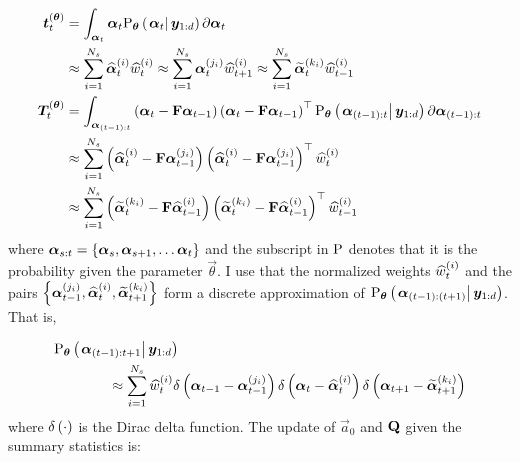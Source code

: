 \begin{equation}\begin{split}
\vec{t}_t^{(\vec{\theta})} &= \int_{\vec{\alpha}_t} \vec{\alpha}_t 
	\optorC{\Prob_{\vec{\theta}}}{\vec{\alpha}_t}{\vec{y}_{1:d}} \partial \vec{\alpha}_t \\
%
& \approx \sum_{i = 1}^{N_s} \particS{\vec{\alpha}}{t}{i} \particS{w}{t}{i} 
\approx \sum_{i = 1}^{N_s} \partic{\vec{\alpha}}{t}{j_i} \particS{w}{t + 1}{i} 
\approx \sum_{i = 1}^{N_s} \particB{\vec{\alpha}}{t}{k_i} \particS{w}{t-1}{i} \\
%
\vec{T}_t^{(\vec{\theta})} &= \int_{\vec{\alpha}_{(t-1):t}} 
	\Lparen{\vec{\alpha}_t - \mat{F}\vec{\alpha}_{t-1}}
	\Lparen{\vec{\alpha}_t - \mat{F}\vec{\alpha}_{t-1}}^\top 
	\optorC{\Prob_{\vec{\theta}}}{\vec{\alpha}_{(t-1):t}}{\vec{y}_{1:d}} 
	\partial \vec{\alpha}_{(t-1):t} \\
%
&\approx \sum_{i = 1}^{N_s}
	\Lparen{\particS{\vec{\alpha}}{t}{i} - \mat{F}\partic{\vec{\alpha}}{t-1}{j_i}}
	\Lparen{\particS{\vec{\alpha}}{t}{i} - \mat{F}\partic{\vec{\alpha}}{t-1}{j_i}}^\top
	\particS{w}{t}{i} \\
%
&\approx \sum_{i = 1}^{N_s}
	\Lparen{\particB{\vec{\alpha}}{t}{k_i} - \mat{F}\particS{\vec{\alpha}}{t-1}{i}}
	\Lparen{\particB{\vec{\alpha}}{t}{k_i} - \mat{F}\particS{\vec{\alpha}}{t-1}{i}}^\top
	\particS{w}{t-1}{i}
\end{split}\end{equation}%
%
% 
where $\vec{\alpha}_{s:t} = \Lbrace{\vec{\alpha}_s, \vec{\alpha}_{s +1}, \dots \vec{\alpha}_t}$ and the subscript in $\text{P}$ denotes that it is the probability given the parameter $\vec{\theta}$. I use that the normalized weights $\widehat{w}_{t}^{\left( i\right)}$ and the pairs $\left\{ \bm{\alpha}_{t-1}^{\left( j_i\right)}, \widehat{\bm{\alpha}}_{t}^{\left( i\right)}, \widetilde{\bm{\alpha}}_{t + 1}^{\left( k_i\right)}\right\}$ form a discrete approximation of $\optorC{\Prob_{\vec{\theta}}}{\vec{\alpha}_{(t-1):(t+1)}}{{\vec{y}_{1:d}}}$. That is, 

\begin{equation}\begin{split}
\optorC{\Prob_{\vec{\theta}}}{\vec{\alpha}_{(t-1):{t+1}}}{\vec{y}_{1:d}} \hspace{-50pt} & \\
%
	& \approx \sum_{i=1}^{N_s}\particS{w}{t}{i} 
		\dirac{\vec{\alpha}_{t - 1} - \partic{\vec{\alpha}}{t-1}{j_i}}
		\dirac{\vec{\alpha}_{t} - \particS{\vec{\alpha}}{t}{i}}
		\dirac{\vec{\alpha}_{t + 1} - \particB{\vec{\alpha}}{t + 1}{k_i}}
\end{split}\end{equation} %
%
% 
where $\delta\left( \cdot\right)$ is the Dirac delta function. The update of $\vec{a}_0$ and $\mathbf{Q}$ given the summary statistics is:

